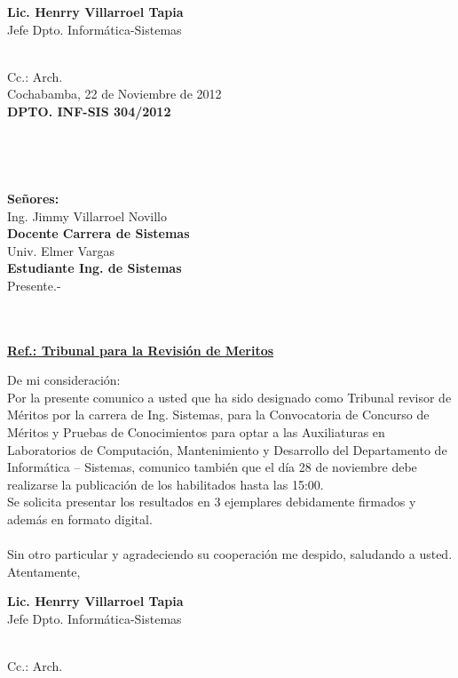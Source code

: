 \documentclass[letterpaper,11pt]{letter}
\begin{document}
\vspace{3.5cm}
\begin{center}
\begin{minipage}[b]{0.5\textwidth}
\begin{center}
{\bf Lic. Henrry Villarroel Tapia}\\
Jefe Dpto. Informática-Sistemas\\
\end{center}
\end{minipage}
\end{center}
~\\
Cc.: Arch.\\
\newpage
Cochabamba, 22 de Noviembre de 2012~\\
 \textbf{DPTO. INF-SIS 304/2012}\\
~\\
~\\
~\\
~\\
 \textbf{Señores:}~\\
Ing. Jimmy Villarroel Novillo~\\
 \textbf{Docente Carrera de Sistemas}~\\
Univ. Elmer Vargas~\\
 \textbf{Estudiante Ing. de Sistemas}~\\
Presente.-\\
~\\
~\\
\begin{center}
\underline{ \textbf{Ref.: Tribunal para la Revisión de Meritos}}
\end{center}
De mi consideración:\\
Por la presente comunico a usted que ha sido designado como Tribunal revisor de Méritos por la carrera de Ing. Sistemas, para la Convocatoria de Concurso de Méritos y Pruebas de Conocimientos para optar a las Auxiliaturas en Laboratorios de Computación, Mantenimiento y Desarrollo del Departamento de Informática – Sistemas, comunico también que el día 28 de noviembre debe realizarse la publicación de los habilitados hasta las 15:00.\\
Se solicita presentar los resultados en 3 ejemplares debidamente firmados y además en formato digital.\\
~\\
Sin otro particular y agradeciendo su cooperación me despido, saludando a usted.\\
Atentamente,\\

\vspace{3.5cm}
\begin{center}
\begin{minipage}[b]{0.5\textwidth}
\begin{center}
{\bf Lic. Henrry Villarroel Tapia}\\
Jefe Dpto. Informática-Sistemas\\
\end{center}
\end{minipage}
\end{center}
~\\
Cc.: Arch.\\
\newpage
\end{document}
